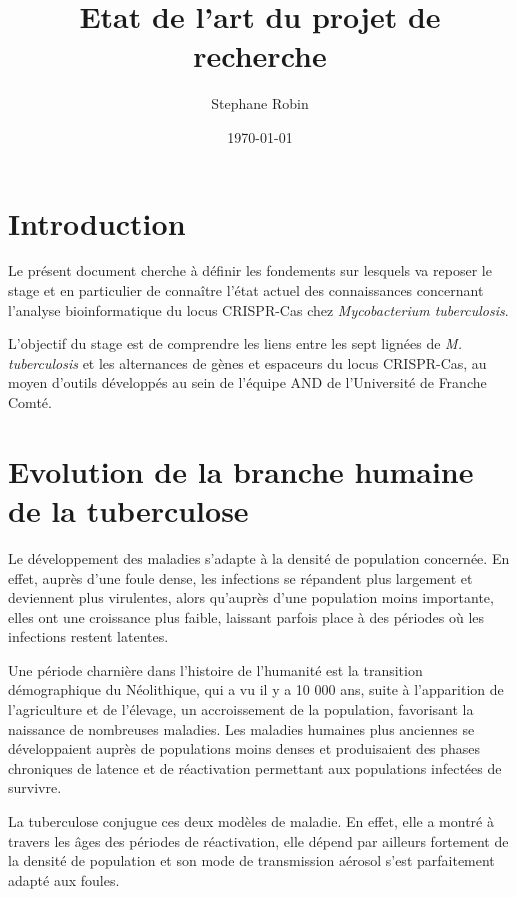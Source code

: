 \documentclass[twoside,a4paper,11pt,frenchb,openany]{report}
\title{Etat de l'art du projet de recherche}
\author{Stephane Robin}
\date{\today}
\begin{document}
\maketitle

\section{Introduction}

Le présent document cherche à définir les fondements sur lesquels va reposer le stage et en particulier de connaître l'état actuel des connaissances concernant l'analyse bioinformatique du locus CRISPR-Cas chez \textit{Mycobacterium tuberculosis}.

L'objectif du stage est de comprendre les liens entre les sept lignées de \textit{M. tuberculosis} et les alternances de gènes et espaceurs du locus CRISPR-Cas, au moyen d'outils développés au sein de l'équipe AND de l'Université de Franche Comté.



\section{Evolution de la branche humaine de la tuberculose}

Le développement des maladies s'adapte à la densité de population concernée. En effet, auprès d'une foule dense, les infections se répandent plus largement et deviennent plus virulentes, alors qu'auprès d'une population moins importante, elles ont une croissance plus faible, laissant parfois place à des périodes où les infections restent latentes.

Une période charnière dans l'histoire de l'humanité est la transition démographique du Néolithique, qui a vu il y a 10 000 ans, suite à l'apparition de l'agriculture et de l'élevage, un accroissement de la population, favorisant la naissance de nombreuses maladies. Les maladies humaines plus anciennes se développaient auprès de populations moins denses et produisaient des phases chroniques de latence et de réactivation permettant aux populations infectées de survivre.

La tuberculose conjugue ces deux modèles de maladie. En effet, elle a montré à travers les âges des périodes de réactivation, elle dépend par ailleurs fortement de la densité de population et son mode de transmission aérosol s'est parfaitement adapté aux foules.
\end{document}
